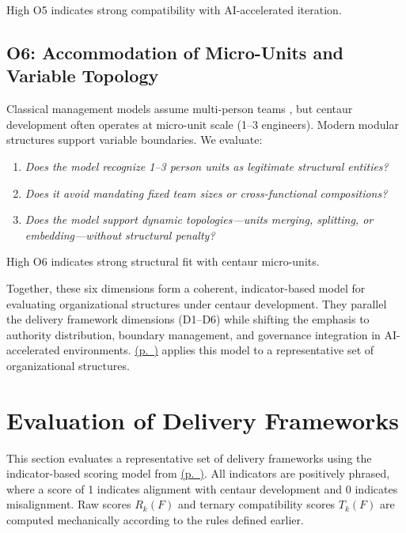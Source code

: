 \documentclass[11pt, a4paper, twocolumn]{article} %
\newcommand{\namerefp}[1]{\hyperref[#1]{\nameref{#1} (p.~\pageref{#1})}}
\begin{document}
High O5 indicates strong compatibility with AI-accelerated iteration.

\subsection*{O6: Accommodation of Micro-Units and Variable Topology}

Classical management models assume multi-person teams
\citep{schwaber2017scrum,mintzberg1979}, but centaur development often operates
at micro-unit scale (1--3 engineers). Modern modular structures
\citep{sanchez1996modular,teamtopologies} support variable boundaries. We
evaluate:

\begin{enumerate}[label=O6.\arabic*), leftmargin=*]
    \item \emph{Does the model recognize 1--3 person units as legitimate
    structural entities?}
    \item \emph{Does it avoid mandating fixed team sizes or cross-functional
    compositions?}
    \item \emph{Does the model support dynamic topologies---units merging,
    splitting, or embedding---without structural penalty?}
\end{enumerate}

High O6 indicates strong structural fit with centaur micro-units.

\medskip

Together, these six dimensions form a coherent, indicator-based model for
evaluating organizational structures under centaur development. They parallel
the delivery framework dimensions (D1--D6) while shifting the emphasis to
authority distribution, boundary management, and governance integration in
AI-accelerated environments. \namerefp{sec:org-eval} applies this model to a
representative set of organizational structures.

\newpage

\section*{Evaluation of Delivery Frameworks}
\label{sec:delivery-eval}

This section evaluates a representative set of delivery frameworks using the
indicator-based scoring model from \namerefp{sec:delivery-dimensions}. All
indicators are positively phrased, where a score of 1 indicates alignment with
centaur development and 0 indicates misalignment. Raw scores $R_k(F)$ and
ternary compatibility scores $T_k(F)$ are computed mechanically according to the
rules defined earlier.
\end{document}
